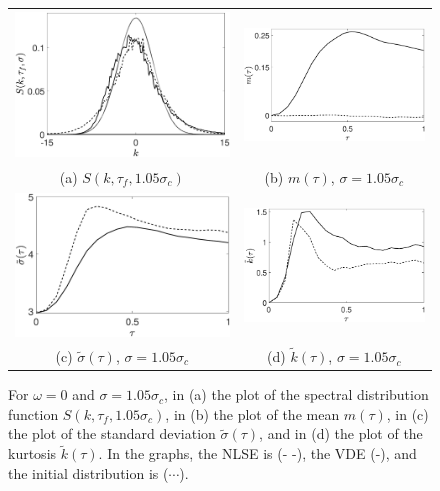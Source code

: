 \documentclass[a4paper,11pt]{article}
\begin{document}
\begin{figure}[!ht]
\centering
\begin{tabular}{cc}
\includegraphics[width=60mm, height=39mm]{pdf_w_0_ep_pt05_Nens_512_sig0_1pt05} & \includegraphics[width=.48\textwidth]{mean_w_0_ep_pt05_Nens_512_sig0_1pt05} \\
(a) $S(k,\tau_{f},1.05\sigma_{c})$ & (b) $m(\tau)$, $\sigma = 1.05\sigma_{c}$\\
\includegraphics[width=.48\textwidth]{std_w_0_ep_pt05_Nens_512_sig0_1pt05} & \includegraphics[width=.48\textwidth]{kts_w_0_ep_pt05_Nens_512_sig0_1pt05} \\
(c) $\tilde{\sigma}(\tau)$, $\sigma = 1.05\sigma_{c}$ & (d) $\tilde{k}(\tau)$, $\sigma = 1.05\sigma_{c}$\\
\end{tabular}
\caption{For $\omega=0$ and $\sigma=1.05 \sigma_{c}$, in (a) the plot of the spectral distribution function $S(k,\tau_{f},1.05\sigma_{c})$, in (b) the plot of the mean $m(\tau)$, in (c) the plot of the standard deviation $\tilde{\sigma}(\tau)$, and in (d) the plot of the kurtosis $\tilde{k}(\tau)$.  In the graphs, the NLSE is (- -), the VDE (-), and the initial distribution is ($\cdots$).}
\label{fig:stbleom0}
\end{figure}
\end{document}
